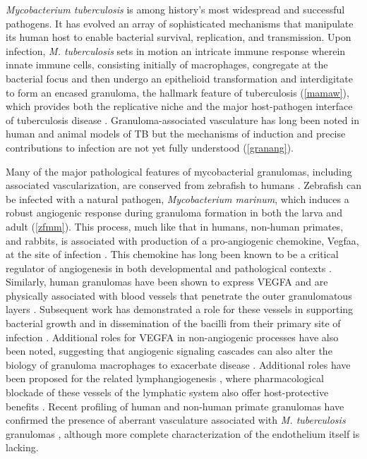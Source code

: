 \textit{Mycobacterium tuberculosis} is among history's most widespread and successful pathogens. It has evolved an array of sophisticated mechanisms that manipulate its human host to enable bacterial survival, replication, and transmission. Upon infection, \textit{M. tuberculosis} sets in motion an intricate immune response wherein innate immune cells, consisting initially of macrophages, congregate at the bacterial focus and then undergo an epithelioid transformation and interdigitate to form an encased granuloma, the hallmark feature of tuberculosis (\autoref{mamaw}), which provides both the replicative niche and the major host\hyp{}pathogen interface of tuberculosis disease \citep{Cronan2016, Pagan2018, Cronan2021}. Granuloma\hyp{}associated vasculature has long been noted in human and animal models of TB \citep{Cudkowicz1952, Russell2010} but the mechanisms of induction and precise contributions to infection are not yet fully understood (\autoref{granang}).

Many of the major pathological features of mycobacterial granulomas, including associated vascularization, are conserved from zebrafish to humans \citep{Swaim2006, Bohrer2021}. Zebrafish can be infected with a natural pathogen, \textit{Mycobacterium marinum}, which induces a robust angiogenic response during granuloma formation in both the larva and adult (\autoref{zfmm}). This process, much like that in humans, non\hyp{}human primates, and rabbits, is associated with production of a pro\hyp{}angiogenic chemokine, Vegfaa, at the site of infection \citep{Oehlers2015}. This chemokine has long been known to be a critical regulator of angiogenesis in both developmental and pathological contexts \citep{Chung2011, Leung1989, Adams2007}. Similarly, human granulomas have been shown to express VEGFA and are physically associated with blood vessels that penetrate the outer granulomatous layers \citep{Datta2015, Guirado2013b}. Subsequent work has demonstrated a role for these vessels in supporting bacterial growth and in dissemination of the bacilli from their primary site of infection \citep{Polena2016}. Additional roles for VEGFA in non\hyp{}angiogenic processes have also been noted, suggesting that angiogenic signaling cascades can also alter the biology of granuloma macrophages to exacerbate disease \citep{Harding2019}. Additional roles have been proposed for the related lymphangiogenesis \citep{Alitalo2005, Duong2012, Lerner2020}, where pharmacological blockade of these vessels of the lymphatic system also offer host\hyp{}protective benefits \citep{Harding2015}. Recent profiling of human and non\hyp{}human primate granulomas have confirmed the presence of aberrant vasculature associated with \textit{M. tuberculosis} granulomas \citep{Gideon2022, McCaffrey2022, Cronan2021}, although more complete characterization of the endothelium itself is lacking.

